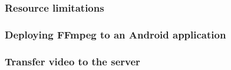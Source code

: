 \subsubsection{Resource limitations}

\subsubsection{Deploying FFmpeg to an Android application}

\subsubsection{Transfer video to the server}
